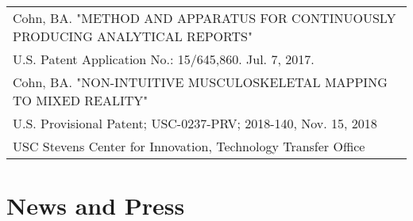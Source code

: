 \documentclass[10pt,a4paper]{article}
\begin{document}
  \vspace*{1mm}
  \begin{tabularx}{17cm}{X}
Cohn, BA. "METHOD AND APPARATUS FOR CONTINUOUSLY PRODUCING ANALYTICAL REPORTS"\\
 U.S. Patent Application No.: 15/645,860. Jul. 7, 2017.\\[2mm]

Cohn, BA. "NON-INTUITIVE MUSCULOSKELETAL MAPPING TO MIXED REALITY"\\
 U.S. Provisional Patent; USC-0237-PRV; 2018-140, Nov. 15, 2018\\
 USC Stevens Center for Innovation, Technology Transfer Office\\[2mm]

  \end{tabularx}

\vspace*{10mm}\section*{News and Press}
\vspace*{1mm}
\noindent
\end{document}
